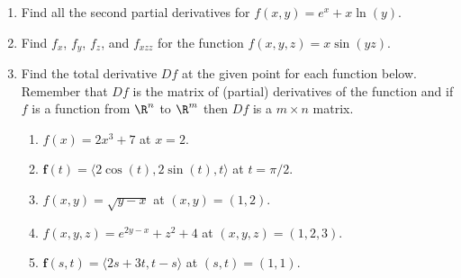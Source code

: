 {\begin{enumerate}
	where $C$ is the speed of sound in meters/second, $T$ is the temprature in degrees Celsius, $S$ is the salinity in grams/liter of water, and $D$ is the depth below the ocean surface in meters.
	
	\begin{enumerate}
		\item State the units in which each of the partial derivatives $C_T,C_S,$ and $C_D$ are expressed and explain the physical meaning of each.
		
		\item Find the partial derivatives $C_T, C_S,$ and $C_D$.
		
		\item Evaluate each of the three partial derivatives at the point where $T=10, S=35$, and $D=100$.  What does the sign of each partial derivative tell us about the behavior of the function $C$ at the point $(10,35,100)$?
	\end{enumerate}

%		
%		
	
	\item Find all the second partial derivatives for $f(x,y)=e^x+x\ln (y).$
	
	\item Find $f_x$, $f_y$, $f_z$, and $f_{xzz}$ for the function $f(x,y,z)=x\sin(yz)$.
	
	\pagebreak
	
	\item Find the total derivative $Df$ at the given point for each function below. Remember that $Df$ is the matrix of (partial) derivatives of the function and if $f$ is a function from $\R^n$ to $\R^m$ then $Df$ is a $m\times n$ matrix.
	\begin{enumerate}
		\item $f(x)=2x^3+7$ at $x=2$.
		\item $\mathbf{f}(t)=\langle 2\cos(t), 2 \sin(t), t\rangle$ at $t=\pi/2$.
		\item $f(x,y)=\sqrt{y-x}$ at $(x,y)=(1,2)$.
		\item $f(x,y,z)=e^{2y-x}+z^2+4$ at $(x,y,z)=(1,2,3)$.
		\item $\mathbf{f}(s,t) = \langle 2s+3t, t-s\rangle$ at $(s,t)=(1,1)$.  
	

\end{enumerate}
\end{enumerate}}
